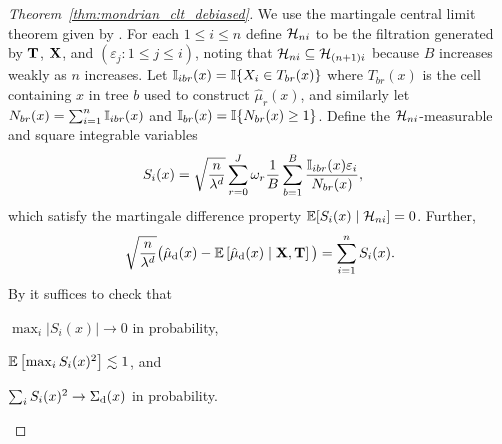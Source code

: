 \begin{proof}[Theorem~\ref{thm:mondrian_clt_debiased}]

  We use the martingale central limit theorem given by
  \citet[Theorem~3.2]{hall1980martingale}.
  For each $1 \leq i \leq n$ define
  $\mathcal{H}_{n i}$ to be the filtration
  generated by $\mathbf{T}$, $\mathbf{X}$, and
  $(\varepsilon_j : 1 \leq j \leq i)$,
  noting that $\mathcal{H}_{n i} \subseteq \mathcal{H}_{(n+1)i}$
  because $B$ increases weakly as $n$ increases.
  Let $\mathbb{I}_{i b r}(x) = \mathbb{I}\{X_i \in T_{b r}(x)\}$
  where $T_{b r}(x)$ is the cell containing $x$ in tree $b$
  used to construct $\hat \mu_r(x)$,
  and similarly let $N_{b r}(x) = \sum_{i=1}^n \mathbb{I}_{i b r}(x)$
  and $\mathbb{I}_{b r}(x) = \mathbb{I}\{N_{b r}(x) \geq 1\}$.
  Define the $\mathcal{H}_{n i}$-measurable and square integrable
  variables
  \begin{align*}
    S_i(x)
    &=
    \sqrt{\frac{n}{\lambda^d}}
    \sum_{r=0}^{J}
    \omega_r
    \frac{1}{B} \sum_{b=1}^B
    \frac{\mathbb{I}_{i b r}(x) \varepsilon_i} {N_{b r}(x)},
  \end{align*}
  which satisfy the martingale
  difference property
  $\mathbb{E} [ S_i(x) \mid \mathcal{H}_{n i} ] = 0$.
  Further,
  \begin{align*}
    \sqrt{\frac{n}{\lambda^d}}
    \big(
      \hat\mu_{\mathrm{d}}(x)
      - \mathbb{E}\left[
        \hat\mu_{\mathrm{d}}(x) \mid \mathbf{X}, \mathbf{T}
      \right]
    \big)
    = \sum_{i=1}^n S_i(x).
  \end{align*}
  By \citet[Theorem~3.2]{hall1980martingale}
  it suffices to check that
  \begin{inlineroman}
    \item $\max_i |S_i(x)| \to 0$ in probability,%
      \label{it:mondrian_app_hall_prob}
    \item $\mathbb{E}\left[\max_i S_i(x)^2\right] \lesssim 1$, and%
      \label{it:mondrian_app_hall_exp}
    \item $\sum_i S_i(x)^2 \to \Sigma_{\mathrm{d}}(x)$ in probability.
      \label{it:mondrian_app_hall_var}
  \end{inlineroman}


\end{proof}
